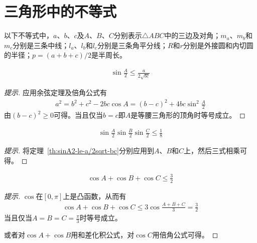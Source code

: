 
\section{三角形中的不等式}
\label{sec:inequality-in-triangle}

以下不等式中，$a$、$b$、$c$及$A$、$B$、$C$分别表示$\triangle ABC$中的三边及对角；$m_a$、$m_b$和$m_c$分别是三条中线；$l_a$、$l_b$和$l_c$分别是三条角平分线；$R$和$r$分别是外接圆和内切圆的半径；$p=(a+b+c)/2$是半周长。

\begin{center}
\end{center}


\begin{theorem}\label{th:sinA2-le-a/2sqrt-bc}
  \begin{align}
    \sin\frac A2\le \frac{a}{2\sqrt{bc}}
  \end{align}
\end{theorem}
\begin{proof}[提示]
  应用余弦定理及倍角公式有
  \begin{align*}
    a^2=b^2+c^2-2bc\cos A=(b-c)^2+4bc\sin^2\frac A2
  \end{align*}
  由$(b-c)^2\ge 0$可得。当且仅当$b=c$即$A$是等腰三角形的顶角时等号成立。
\end{proof}

\begin{theorem}
  \begin{align}
    \sin\frac A2 \sin\frac B2 \sin\frac C2\le \frac 18
  \end{align}
\end{theorem}
\begin{proof}[提示]
  将定理~\ref{th:sinA2-le-a/2sqrt-bc}分别应用到$A$、$B$和$C$上，然后三式相乘可得。
\end{proof}

\begin{theorem}\label{th:cosA+cosB+cosC-le-frac32}
  \begin{align}
    \cos A + \cos B + \cos C \le \frac 32
  \end{align}
\end{theorem}
\begin{proof}[提示]
  $\cos$在$[0,\pi]$上是凸函数，从而有
  \begin{align*}
    \cos A + \cos B + \cos C \le 3 \cos\frac{A+B+C}{3} = \frac 32
  \end{align*}
  当且仅当$A=B=C=\frac \pi3$时等号成立。

  或者对$\cos A + \cos B$用和差化积公式，对$\cos C$用倍角公式可得。
\end{proof}

